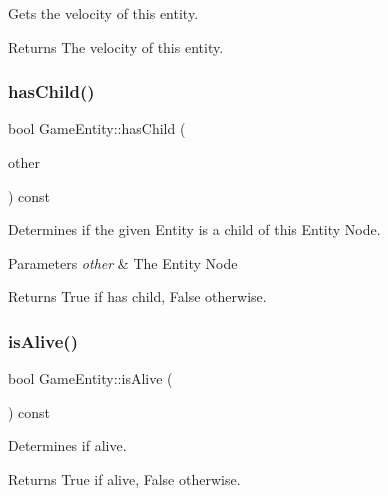 Gets the velocity of this entity. 

\begin{DoxyReturn}{Returns}
The velocity of this entity. 
\end{DoxyReturn}
\mbox{\label{class_game_entity_a273f246386eeb6551607493402af1369}} 
\subsubsection{\texorpdfstring{hasChild()}{hasChild()}}
{\footnotesize\ttfamily bool Game\+Entity\+::has\+Child (\begin{DoxyParamCaption}\item[{\mbox{\hyperlink{class_game_entity}{Game\+Entity}} $\ast$}]{other }\end{DoxyParamCaption}) const\hspace{0.3cm}{\ttfamily [inline]}}



Determines if the given Entity is a child of this Entity Node. 


\begin{DoxyParams}{Parameters}
{\em other} & The Entity Node\\
\hline
\end{DoxyParams}
\begin{DoxyReturn}{Returns}
True if has child, False otherwise. 
\end{DoxyReturn}
\mbox{\label{class_game_entity_af07dae87e7d895f3a458c6bba84f76e0}} 
\subsubsection{\texorpdfstring{isAlive()}{isAlive()}}
{\footnotesize\ttfamily bool Game\+Entity\+::is\+Alive (\begin{DoxyParamCaption}{ }\end{DoxyParamCaption}) const\hspace{0.3cm}{\ttfamily [inline]}}



Determines if alive. 

\begin{DoxyReturn}{Returns}
True if alive, False otherwise. 
\end{DoxyReturn}
\mbox{\label{class_game_entity_af53b7178f6a8ce3878f93a65ef7e6dd6}} 

